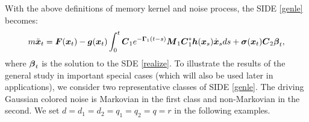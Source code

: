 With the above definitions of memory kernel and noise process, the SIDE \eqref{genle} becomes:
\begin{equation} \label{genle_general}
 m \ddot{\boldsymbol{x}}_{t} =  \boldsymbol{F}(\boldsymbol{x}_{t}) - \boldsymbol{g}(\boldsymbol{x}_{t}) \int_{0}^{t} \boldsymbol{C}_1 e^{-\boldsymbol{\Gamma}_1(t-s)} \boldsymbol{M}_1\boldsymbol{C}_1^* \boldsymbol{h}(\boldsymbol{x}_{s}) \dot{\boldsymbol{x}}_{s} ds +  \boldsymbol{\sigma}(\boldsymbol{x}_{t}) \boldsymbol{C}_2 \boldsymbol{\beta}_{t}, 
\end{equation}
where $\boldsymbol{\beta}_t$ is the solution to the SDE \eqref{realize}.
To illustrate the results of the general study in important special cases (which will also be used later in applications), we consider two representative classes of SIDE \eqref{genle}. The driving Gaussian colored noise is Markovian in the first class and non-Markovian in the second. We set $d=d_1=d_2=q_1=q_2=q=r$ in the following  examples. 

